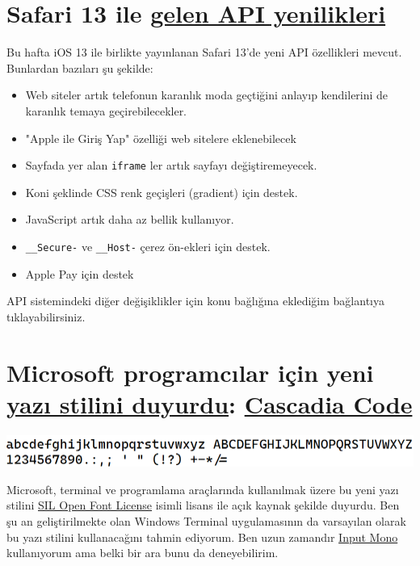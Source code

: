 \documentclass[11pt]{article}
\begin{document}
\section{Safari 13 ile \href{https://developer.apple.com/documentation/safari\_release\_notes/safari\_13\_release\_notes}{gelen API yenilikleri}}
\label{sec:org8028c3d}
Bu hafta iOS 13 ile birlikte yayınlanan Safari 13'de yeni API özellikleri
mevcut. Bunlardan bazıları şu şekilde:
\begin{itemize}
\item Web siteler artık telefonun karanlık moda geçtiğini anlayıp kendilerini de
karanlık temaya geçirebilecekler.
\item "Apple ile Giriş Yap" özelliği web sitelere eklenebilecek
\item Sayfada yer alan \texttt{iframe} ler artık sayfayı değiştiremeyecek.
\item Koni şeklinde CSS renk geçişleri (gradient) için destek.
\item JavaScript artık daha az bellik kullanıyor.
\item \texttt{\_\_Secure-} ve \texttt{\_\_Host-} çerez ön-ekleri için destek.
\item Apple Pay için destek
\end{itemize}

API sistemindeki diğer değişiklikler için konu bağlığına eklediğim
bağlantıya tıklayabilirsiniz.
\section{Microsoft programcılar için yeni \href{https://devblogs.microsoft.com/commandline/cascadia-code/}{yazı stilini duyurdu}: \href{https://github.com/microsoft/cascadia-code}{Cascadia Code}}
\label{sec:orge422b45}
\begin{center}
\includegraphics[width=.9\linewidth]{gorseller/cascadia-code-characters.png}
\end{center}

Microsoft, terminal ve programlama araçlarında kullanılmak üzere bu yeni yazı
stilini \href{https://scripts.sil.org/cms/scripts/page.php?site\_id=nrsi\&id=OFL}{SIL Open Font License} isimli lisans ile açık kaynak şekilde duyurdu.
Ben şu an geliştirilmekte olan Windows Terminal uygulamasının da varsayılan
olarak bu yazı stilini kullanacağını tahmin ediyorum. Ben uzun zamandır \href{https://input.fontbureau.com/}{Input
Mono} kullanıyorum ama belki bir ara bunu da deneyebilirim.
\end{document}
